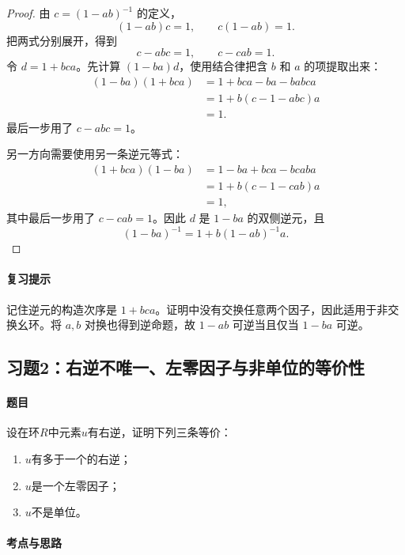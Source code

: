 \begin{proof}

由 $c=(1-ab)^{-1}$ 的定义，
\[
(1-ab)c=1,\qquad c(1-ab)=1.
\]
把两式分别展开，得到
\[
c-abc=1,\qquad c-cab=1.
\]
令 $d=1+bca$。先计算 $(1-ba)d$，使用结合律把含 $b$ 和 $a$ 的项提取出来：
\begin{align*}
(1-ba)(1+bca)
  &=1+bca-ba-babca\\
  &=1+b(c-1-abc)a\\
  &=1.
\end{align*}
最后一步用了 $c-abc=1$。

另一方向需要使用另一条逆元等式：
\begin{align*}
(1+bca)(1-ba)
  &=1-ba+bca-bcaba\\
  &=1+b(c-1-cab)a\\
  &=1,
\end{align*}
其中最后一步用了 $c-cab=1$。因此 $d$ 是 $1-ba$ 的双侧逆元，且
\[
\boxed{(1-ba)^{-1}=1+b(1-ab)^{-1}a.}
\]

\end{proof}

\paragraph{复习提示}

记住逆元的构造次序是 $1+bca$。证明中没有交换任意两个因子，因此适用于非交换幺环。将 $a,b$ 对换也得到逆命题，故 $1-ab$ 可逆当且仅当 $1-ba$ 可逆。



\subsection{习题2：右逆不唯一、左零因子与非单位的等价性}

\label{ex:3:2}

\paragraph{题目}

设在环$R$中元素$u$有右逆，证明下列三条等价：
\begin{enumerate}[label=(\roman*)]
\item $u$有多于一个的右逆；
\item $u$是一个左零因子；
\item $u$不是单位。
\end{enumerate}

\paragraph{考点与思路}

